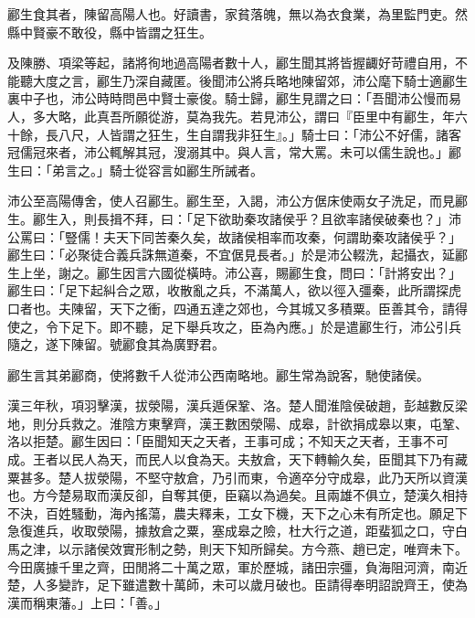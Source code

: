 
\begin{pinyinscope}
酈生食其者，陳留高陽人也。好讀書，家貧落魄，無以為衣食業，為里監門吏。然縣中賢豪不敢役，縣中皆謂之狂生。

及陳勝、項梁等起，諸將徇地過高陽者數十人，酈生聞其將皆握齱好苛禮自用，不能聽大度之言，酈生乃深自藏匿。後聞沛公將兵略地陳留郊，沛公麾下騎士適酈生裏中子也，沛公時時問邑中賢士豪俊。騎士歸，酈生見謂之曰：「吾聞沛公慢而易人，多大略，此真吾所願從游，莫為我先。若見沛公，謂曰『臣里中有酈生，年六十餘，長八尺，人皆謂之狂生，生自謂我非狂生』。」騎士曰：「沛公不好儒，諸客冠儒冠來者，沛公輒解其冠，溲溺其中。與人言，常大罵。未可以儒生說也。」酈生曰：「弟言之。」騎士從容言如酈生所誡者。

沛公至高陽傳舍，使人召酈生。酈生至，入謁，沛公方倨床使兩女子洗足，而見酈生。酈生入，則長揖不拜，曰：「足下欲助秦攻諸侯乎？且欲率諸侯破秦也？」沛公罵曰：「豎儒！夫天下同苦秦久矣，故諸侯相率而攻秦，何謂助秦攻諸侯乎？」酈生曰：「必聚徒合義兵誅無道秦，不宜倨見長者。」於是沛公輟洗，起攝衣，延酈生上坐，謝之。酈生因言六國從橫時。沛公喜，賜酈生食，問曰：「計將安出？」酈生曰：「足下起糾合之眾，收散亂之兵，不滿萬人，欲以徑入彊秦，此所謂探虎口者也。夫陳留，天下之衝，四通五達之郊也，今其城又多積粟。臣善其令，請得使之，令下足下。即不聽，足下舉兵攻之，臣為內應。」於是遣酈生行，沛公引兵隨之，遂下陳留。號酈食其為廣野君。

酈生言其弟酈商，使將數千人從沛公西南略地。酈生常為說客，馳使諸侯。

漢三年秋，項羽擊漢，拔滎陽，漢兵遁保鞏、洛。楚人聞淮陰侯破趙，彭越數反梁地，則分兵救之。淮陰方東擊齊，漢王數困滎陽、成皋，計欲捐成皋以東，屯鞏、洛以拒楚。酈生因曰：「臣聞知天之天者，王事可成；不知天之天者，王事不可成。王者以民人為天，而民人以食為天。夫敖倉，天下轉輸久矣，臣聞其下乃有藏粟甚多。楚人拔滎陽，不堅守敖倉，乃引而東，令適卒分守成皋，此乃天所以資漢也。方今楚易取而漢反卻，自奪其便，臣竊以為過矣。且兩雄不俱立，楚漢久相持不決，百姓騷動，海內搖蕩，農夫釋耒，工女下機，天下之心未有所定也。願足下急復進兵，收取滎陽，據敖倉之粟，塞成皋之險，杜大行之道，距蜚狐之口，守白馬之津，以示諸侯效實形制之勢，則天下知所歸矣。方今燕、趙已定，唯齊未下。今田廣據千里之齊，田閒將二十萬之眾，軍於歷城，諸田宗彊，負海阻河濟，南近楚，人多變詐，足下雖遣數十萬師，未可以歲月破也。臣請得奉明詔說齊王，使為漢而稱東藩。」上曰：「善。」


\end{pinyinscope}

